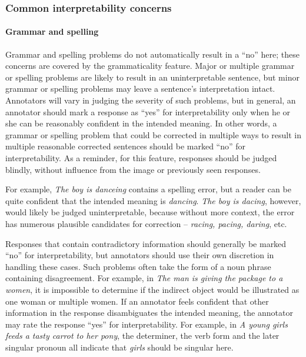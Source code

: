 \documentclass[12pt,notitlepage]{article}
\begin{document}
\subsubsection{Common interpretability concerns}

\paragraph{Grammar and spelling} \label{para:interp-grammar} Grammar and spelling problems do not automatically result in a ``no'' here; these concerns are covered by the grammaticality feature. Major or multiple grammar or spelling problems are likely to result in an uninterpretable sentence, but minor grammar or spelling problems may leave a sentence's interpretation intact. Annotators will vary in judging the severity of such problems, but in general, an annotator should mark a response as ``yes'' for interpretability only when he or she can be reasonably confident in the intended meaning. In other words, a grammar or spelling problem that could be corrected in multiple ways to result in multiple reasonable corrected sentences should be marked ``no'' for interpretability. As a reminder, for this feature, responses should be judged blindly, without influence from the image or previously seen responses.

For example, \textit{The boy is danceing} contains a spelling error, but a reader can be quite confident that the intended meaning is \textit{dancing}. \textit{The boy is dacing}, however, would likely be judged uninterpretable, because without more context, the error has numerous plausible candidates for correction -- \textit{racing, pacing, daring}, etc.

Responses that contain contradictory information should generally be marked ``no'' for interpretability, but annotators should use their own discretion in handling these cases. Such problems often take the form of a noun phrase containing disagreement. For example, in \textit{The man is giving the package to a women}, it is impossible to determine if the indirect object would be illustrated as one woman or multiple women. If an annotator feels confident that other information in the response disambiguates the intended meaning, the annotator may rate the response ``yes'' for interpretability. For example, in \textit{A young girls feeds a tasty carrot to her pony}, the determiner, the verb form and the later singular pronoun all indicate that \textit{girls} should be singular here.
\end{document}
